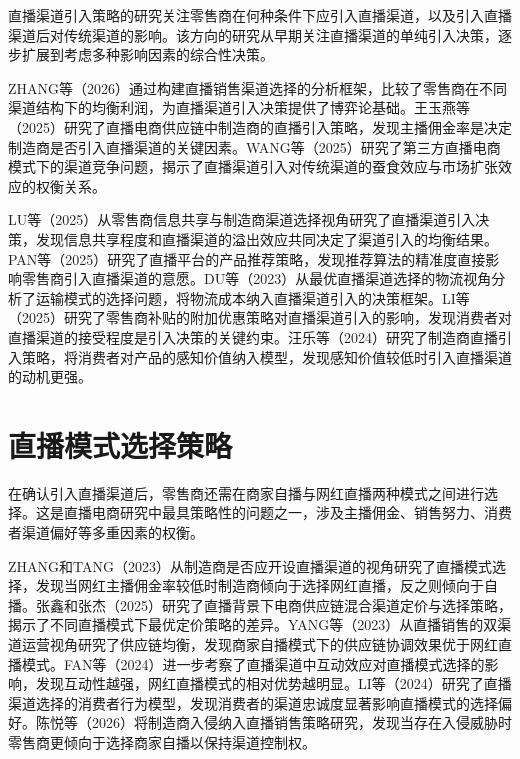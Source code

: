 \documentclass[12pt,a4paper]{article}
\begin{document}
直播渠道引入策略的研究关注零售商在何种条件下应引入直播渠道，以及引入直播渠道后对传统渠道的影响。该方向的研究从早期关注直播渠道的单纯引入决策，逐步扩展到考虑多种影响因素的综合性决策。

ZHANG等（2026）通过构建直播销售渠道选择的分析框架，比较了零售商在不同渠道结构下的均衡利润，为直播渠道引入决策提供了博弈论基础\cite{zhang2026}。王玉燕等（2025）研究了直播电商供应链中制造商的直播引入策略，发现主播佣金率是决定制造商是否引入直播渠道的关键因素\cite{wang2025}。WANG等（2025）研究了第三方直播电商模式下的渠道竞争问题，揭示了直播渠道引入对传统渠道的蚕食效应与市场扩张效应的权衡关系\cite{wang2025b}。

LU等（2025）从零售商信息共享与制造商渠道选择视角研究了直播渠道引入决策，发现信息共享程度和直播渠道的溢出效应共同决定了渠道引入的均衡结果\cite{lu2025}。PAN等（2025）研究了直播平台的产品推荐策略，发现推荐算法的精准度直接影响零售商引入直播渠道的意愿\cite{pan2025}。DU等（2023）从最优直播渠道选择的物流视角分析了运输模式的选择问题，将物流成本纳入直播渠道引入的决策框架\cite{du2023}。LI等（2025）研究了零售商补贴的附加优惠策略对直播渠道引入的影响，发现消费者对直播渠道的接受程度是引入决策的关键约束\cite{li2025}。汪乐等（2024）研究了制造商直播引入策略，将消费者对产品的感知价值纳入模型，发现感知价值较低时引入直播渠道的动机更强\cite{wang2024}。

\section{直播模式选择策略}

在确认引入直播渠道后，零售商还需在商家自播与网红直播两种模式之间进行选择。这是直播电商研究中最具策略性的问题之一，涉及主播佣金、销售努力、消费者渠道偏好等多重因素的权衡。

ZHANG和TANG（2023）从制造商是否应开设直播渠道的视角研究了直播模式选择，发现当网红主播佣金率较低时制造商倾向于选择网红直播，反之则倾向于自播\cite{zhang2023}。张鑫和张杰（2025）研究了直播背景下电商供应链混合渠道定价与选择策略，揭示了不同直播模式下最优定价策略的差异\cite{zhangxin2025}。YANG等（2023）从直播销售的双渠道运营视角研究了供应链均衡，发现商家自播模式下的供应链协调效果优于网红直播模式\cite{yang2023}。FAN等（2024）进一步考察了直播渠道中互动效应对直播模式选择的影响，发现互动性越强，网红直播模式的相对优势越明显\cite{fan2024}。LI等（2024）研究了直播渠道选择的消费者行为模型，发现消费者的渠道忠诚度显著影响直播模式的选择偏好\cite{li2024}。陈悦等（2026）将制造商入侵纳入直播销售策略研究，发现当存在入侵威胁时零售商更倾向于选择商家自播以保持渠道控制权\cite{chen2026}。
\end{document}
